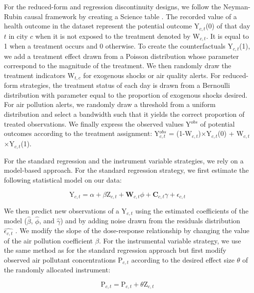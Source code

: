\documentclass[12pt]{article}
\begin{document}
        For the reduced-form and regression discontinuity designs, we follow the Neyman-Rubin causal framework by creating a Science table \citep{rubin_estimating_1974}. The recorded value of a health outcome in the dataset represent the potential outcome Y$_{c,t}$(0) of that day $t$ in city $c$ when it is not exposed to the treatment denoted by W$_{c,t}$. It is equal to 1 when a treatment occurs and 0 otherwise. To create the counterfactuals Y$_{c,t}$(1), we add a treatment effect drawn from a Poisson distribution whose parameter correspond to the magnitude of the treatment. We then randomly draw the treatment indicators W$_{t,c}$ for exogenous shocks or air quality alerts. For reduced-form strategies, the treatment status of each day is drawn from a Bernoulli distribution with parameter equal to the proportion of exogenous shocks desired. For air pollution alerts, we randomly draw a threshold from a uniform distribution and select a bandwidth such that it yields the correct proportion of treated observations. We finally express the observed values Y$^{obs}$ of potential outcomes according to the treatment assignment: Y$^{obs}_{c,t}$ = (1-W$_{c,t}$)$\times$Y$_{c,t}$(0) + W$_{c,t}$$\times$Y$_{c,t}$(1).
      
        For the standard regression and the instrument variable strategies, we rely on a model-based approach. For the standard regression strategy, we first estimate the following statistical model on our data:
        
        \begin{equation*}
        \text{Y}_{c,t} = \alpha + \beta\text{Z}_{c,t} + \textbf{W}_{c,t}\phi + \textbf{C}_{c,t}\gamma + \epsilon_{c,t}
        \end{equation*}
        
        \noindent We then predict new observations of a $\text{Y}_{c,t}$ using the estimated coefficients of the model ($\hat{\beta}$, $\hat{\phi}$, and $\hat{\gamma}$) and by adding noise drawn from the residuals distribution $\widehat{\epsilon_{c,t}}$ \citep{peng2006model}. We modify the slope of the dose-response relationship by changing the value of the air pollution coefficient $\beta$. For the instrumental variable strategy, we use the same method as for the standard regression approach but first modify observed air pollutant concentrations $\text{P}_{c,t}$ according to the desired effect size $\theta$ of the randomly allocated instrument: 
        
        \begin{equation*}
        \text{P}_{c,t} = \text{P}_{c,t} + \theta\text{Z}_{c,t}
        \end{equation*}
        
\end{document}
